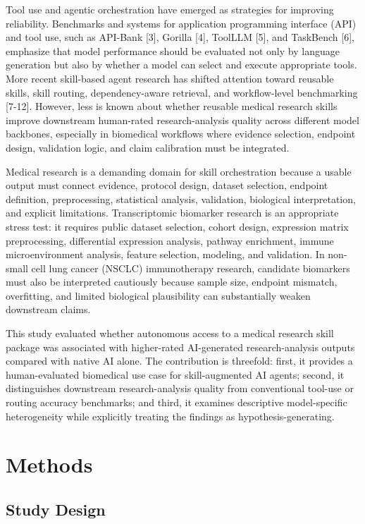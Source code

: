 \documentclass[11pt]{article}
\begin{document}
Tool use and agentic orchestration have emerged as strategies for improving reliability. Benchmarks and systems for application programming interface (API) and tool use, such as API-Bank [3], Gorilla [4], ToolLLM [5], and TaskBench [6], emphasize that model performance should be evaluated not only by language generation but also by whether a model can select and execute appropriate tools. More recent skill-based agent research has shifted attention toward reusable skills, skill routing, dependency-aware retrieval, and workflow-level benchmarking [7-12]. However, less is known about whether reusable medical research skills improve downstream human-rated research-analysis quality across different model backbones, especially in biomedical workflows where evidence selection, endpoint design, validation logic, and claim calibration must be integrated.

Medical research is a demanding domain for skill orchestration because a usable output must connect evidence, protocol design, dataset selection, endpoint definition, preprocessing, statistical analysis, validation, biological interpretation, and explicit limitations. Transcriptomic biomarker research is an appropriate stress test: it requires public dataset selection, cohort design, expression matrix preprocessing, differential expression analysis, pathway enrichment, immune microenvironment analysis, feature selection, modeling, and validation. In non-small cell lung cancer (NSCLC) immunotherapy research, candidate biomarkers must also be interpreted cautiously because sample size, endpoint mismatch, overfitting, and limited biological plausibility can substantially weaken downstream claims.

This study evaluated whether autonomous access to a medical research skill package was associated with higher-rated AI-generated research-analysis outputs compared with native AI alone. The contribution is threefold: first, it provides a human-evaluated biomedical use case for skill-augmented AI agents; second, it distinguishes downstream research-analysis quality from conventional tool-use or routing accuracy benchmarks; and third, it examines descriptive model-specific heterogeneity while explicitly treating the findings as hypothesis-generating.

\section{Methods}

\subsection{Study Design}
\end{document}
